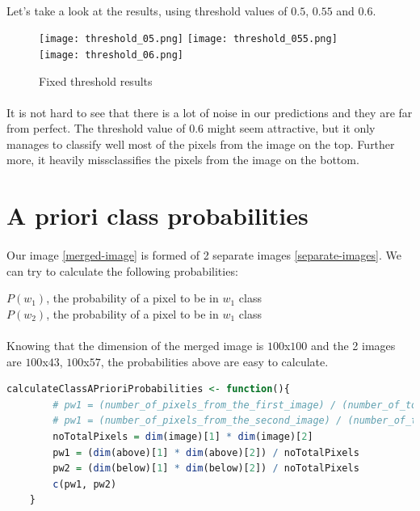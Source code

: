 \clearpage

\paragraph{}
Let's take a look at the results, using threshold values of $0.5$, $0.55$ and $0.6$.

\begin{figure}[h]
    \centering
    \texttt{[image: threshold\_05.png]}
    \texttt{[image: threshold\_055.png]}
    \texttt{[image: threshold\_06.png]}
    \caption{Fixed threshold results}
    \label{}
\end{figure}

\paragraph{}
It is not hard to see that there is a lot of noise in our predictions and they are far from perfect.
The threshold value of $0.6$ might seem attractive, but it only manages to classify well most of the pixels from the image on the top.
Further more, it heavily missclassifies the pixels from the image on the bottom.

\section{A priori class probabilities}
\paragraph{}
Our image \ref{merged-image} is formed of 2 separate images \ref{separate-images}.
We can try to calculate the following probabilities:
\begin{center}
    $P(w_1)$, the probability of a pixel to be in $w_1$ class
    \\
    $P(w_2)$, the probability of a pixel to be in $w_1$ class
\end{center}

\paragraph{}
Knowing that the dimension of the merged image is $100$x$100$ and the 2 images are $100$x$43$, $100$x$57$, the probabilities above are easy to calculate.

\begin{lstlisting}[language=R, caption=A priori class probabilities]
    calculateClassAPrioriProbabilities <- function(){
        # pw1 = (number_of_pixels_from_the_first_image) / (number_of_total_pixels)
        # pw1 = (number_of_pixels_from_the_second_image) / (number_of_total_pixels)
        noTotalPixels = dim(image)[1] * dim(image)[2]
        pw1 = (dim(above)[1] * dim(above)[2]) / noTotalPixels
        pw2 = (dim(below)[1] * dim(below)[2]) / noTotalPixels
        c(pw1, pw2)
    }
\end{lstlisting}

